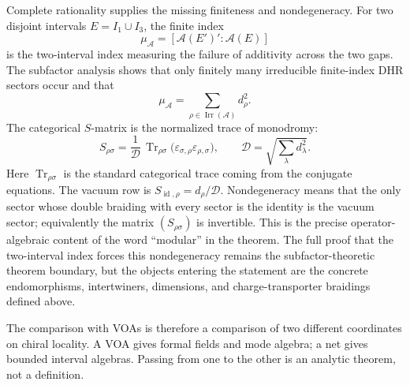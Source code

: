 Complete rationality supplies the missing finiteness and nondegeneracy.
For two disjoint intervals \(E=I_1\cup I_3\), the finite index
\[
  \mu_{\mathcal A}=[\mathcal A(E')':\mathcal A(E)]
\]
is the two-interval index measuring the failure of additivity across the two
gaps.  The subfactor analysis shows that only finitely many irreducible
finite-index DHR sectors occur and that
\begin{equation}
  \mu_{\mathcal A}
  =
  \sum_{\rho\in\operatorname{Irr}(\mathcal A)}d_\rho^2 .
  \label{eq:dhr-mu-index-global-dimension}
\end{equation}
The categorical \(S\)-matrix is the normalized trace of monodromy:
\begin{equation}
  S_{\rho\sigma}
  =
  \frac{1}{\mathcal D}\,
  \operatorname{Tr}_{\rho\sigma}
  \bigl(\varepsilon_{\sigma,\rho}\varepsilon_{\rho,\sigma}\bigr),
  \qquad
  \mathcal D=\sqrt{\sum_\lambda d_\lambda^2}.
  \label{eq:dhr-categorical-s-matrix}
\end{equation}
Here \(\operatorname{Tr}_{\rho\sigma}\) is the standard categorical trace
coming from the conjugate equations.  The vacuum row is
\(S_{\operatorname{id},\rho}=d_\rho/\mathcal D\).  Nondegeneracy means that
the only sector whose double braiding with every sector is the identity is
the vacuum sector; equivalently the matrix
\((S_{\rho\sigma})\) is invertible.  This is the precise operator-algebraic
content of the word ``modular'' in the theorem.  The full proof that the
two-interval index forces this nondegeneracy remains the subfactor-theoretic
theorem boundary, but the objects entering the statement are the concrete
endomorphisms, intertwiners, dimensions, and charge-transporter braidings
defined above.

The comparison with VOAs is therefore a comparison of two different
coordinates on chiral locality.  A VOA gives formal fields and mode algebra;
a net gives bounded interval algebras.  Passing from one to the other is an
analytic theorem, not a definition.

